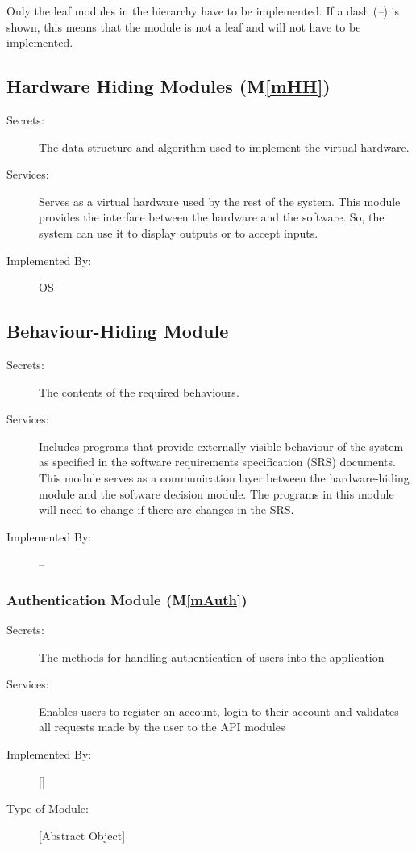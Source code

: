 \documentclass[12pt, titlepage]{article}
\newcommand{\mref}[1]{M\ref{#1}}
\begin{document}
Only the leaf modules in the hierarchy have to be implemented. If a dash
(\emph{--}) is shown, this means that the module is not a leaf and will not have
to be implemented.

\subsection{Hardware Hiding Modules (\mref{mHH})}

\begin{description}
\item[Secrets:]The data structure and algorithm used to implement the virtual
  hardware.
\item[Services:]Serves as a virtual hardware used by the rest of the
  system. This module provides the interface between the hardware and the
  software. So, the system can use it to display outputs or to accept inputs.
\item[Implemented By:] OS
\end{description}

\subsection{Behaviour-Hiding Module}

\begin{description}
  \item[Secrets:]The contents of the required behaviours.
  \item[Services:]Includes programs that provide externally visible behaviour of
    the system as specified in the software requirements specification (SRS)
    documents. This module serves as a communication layer between the
    hardware-hiding module and the software decision module. The programs in this
    module will need to change if there are changes in the SRS.
  \item[Implemented By:] --
\end{description}

\subsubsection{Authentication Module (\mref{mAuth})}

\begin{description}
\item[Secrets:]The methods for handling authentication of users into the application
\item[Services:]Enables users to register an account, login to their account and validates all requests made by the user to the API modules
\item[Implemented By:] [\progname]
\item[Type of Module:] [Abstract Object]
\end{description}
\end{document}

